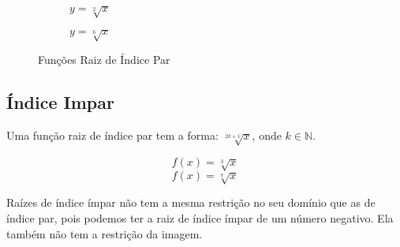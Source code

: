 \begin{figure}[H]
\centering
	\begin{subfigure}[b]{0.4\linewidth}
	\centering
	\caption{$y=\sqrt[2]{x}$}
	\end{subfigure}
	\qquad
	\begin{subfigure}[b]{0.4\textwidth}
	\centering
	\caption{$y=\sqrt[6]{x}$}
	\end{subfigure}
\caption{Funções Raiz de Índice Par}
\end{figure}

\subsection{Índice Impar}
Uma função raiz de índice par tem a forma: $\sqrt[2k+1]{x}$, onde $k \in \mathbb{N}$. 
\begin{exemplo}
\[f(x)=\sqrt[3]{x}\] \vspace{-1.6cm} \[f(x)=\sqrt[7]{x}\]
\end{exemplo}
Raízes de índice ímpar não tem a mesma restrição no seu domínio que as de índice par, pois podemos ter a raiz de índice ímpar de um número negativo. Ela também não tem a restrição da imagem.

